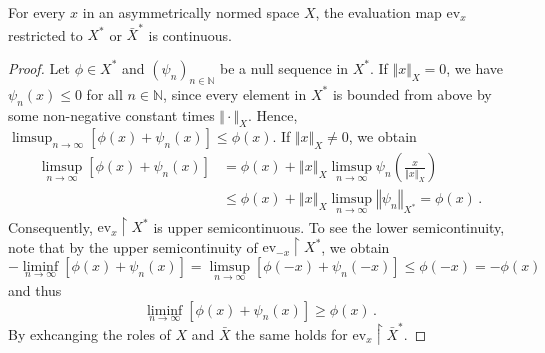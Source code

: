 \documentclass[10pt,a4paper]{amsart}
\begin{document}
\begin{lemma}
\label{lem:EvaluationMap}
For every $x$ in an asymmetrically normed space $X$, the evaluation map $\mathrm{ev}_x$ restricted to $X^*$ or $\bar{X}^*$ is continuous.
\end{lemma}

\begin{proof}
Let $\phi \in X^*$ and $(\psi_n)_{n \in \mathbb{N}}$ be a null sequence in $X^*$.
If $\Vert x \Vert_{X} = 0$, we have $\psi_n(x) \le 0$ for all $n \in \mathbb{N}$, since every element in $X^*$ is bounded from above by some non-negative constant times $\Vert \cdot \Vert_{X}$.
Hence, $\limsup_{n \to \infty}  [ \phi( x ) + \psi_n( x ) ] \le \phi( x )$.
If $\Vert x \Vert_{X}  \neq 0$, we obtain
%
\begin{equation}
\begin{aligned}
\limsup_{n \to \infty} \left[ \phi \left( x \right) + \psi_n \left( x \right) \right]
&=
\phi \left( x \right) + \left\Vert x \right\Vert_{X} \limsup_{n \to \infty} \psi_n \left( \frac{x}{\left\Vert x \right\Vert_{X} } \right) \\
&\le
\phi \left( x \right) + \left\Vert x \right\Vert_{X} \limsup_{n \to \infty}  \left\Vert \psi_n \right\Vert_{X^*}
=
\phi \left( x \right) \, .
\end{aligned}
\end{equation}
%
Consequently, $\mathrm{ev}_x \upharpoonright X^*$ is upper semicontinuous.
To see the lower semicontinuity, note that by the upper semicontinuity of $\mathrm{ev}_{-x} \upharpoonright X^*$, we obtain
%
\begin{equation}
- \liminf_{n \to \infty} \left[ \phi \left( x \right) + \psi_n \left( x \right) \right]
=
\limsup_{n \to \infty} \left[ \phi \left( -x \right) + \psi_n \left( -x \right) \right]
\le
\phi \left( -x \right)
=
- \phi \left( x \right)
\end{equation}
%
and thus
%
\begin{equation}
\liminf_{n \to \infty} \left[ \phi \left( x \right) + \psi_n \left( x \right) \right]
\ge
\phi \left( x \right) \, .
\end{equation}
%
By exhcanging the roles of $X$ and $\bar{X}$ the same holds for $\mathrm{ev}_x \upharpoonright \bar{X}^*$.
\end{proof}
\end{document}
